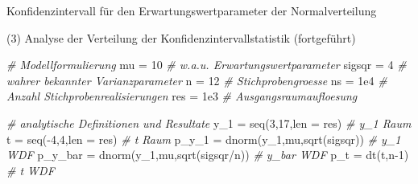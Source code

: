 \documentclass[
  8pt,
  ignorenonframetext,
]{beamer}
\newenvironment{Shaded}{\begin{snugshade}}{\end{snugshade}}
\newcommand{\AttributeTok}[1]{\textcolor[rgb]{0.77,0.63,0.00}{#1}}
\newcommand{\CommentTok}[1]{\textcolor[rgb]{0.56,0.35,0.01}{\textit{#1}}}
\newcommand{\DecValTok}[1]{\textcolor[rgb]{0.00,0.00,0.81}{#1}}
\newcommand{\FloatTok}[1]{\textcolor[rgb]{0.00,0.00,0.81}{#1}}
\newcommand{\FunctionTok}[1]{\textcolor[rgb]{0.00,0.00,0.00}{#1}}
\newcommand{\NormalTok}[1]{#1}
\newcommand{\OtherTok}[1]{\textcolor[rgb]{0.56,0.35,0.01}{#1}}
\newcommand{\SpecialCharTok}[1]{\textcolor[rgb]{0.00,0.00,0.00}{#1}}
\begin{document}
\begin{frame}[fragile]{Konfidenzintervall für den
Erwartungswertparameter der Normalverteilung}
\protect\hypertarget{konfidenzintervall-fuxfcr-den-erwartungswertparameter-der-normalverteilung-1}{}
\normalsize

\noindent (3) Analyse der Verteilung der Konfidenzintervallstatistik
(fortgeführt) \vspace{2mm}

\tiny
{}

\begin{Shaded}
\begin{Highlighting}[]
\CommentTok{\# Modellformulierung}
\NormalTok{mu      }\OtherTok{=} \DecValTok{10}                                          \CommentTok{\# w.a.u. Erwartungswertparameter}
\NormalTok{sigsqr  }\OtherTok{=} \DecValTok{4}                                           \CommentTok{\# wahrer bekannter Varianzparameter}
\NormalTok{n       }\OtherTok{=} \DecValTok{12}                                          \CommentTok{\# Stichprobengroesse}
\NormalTok{ns      }\OtherTok{=} \FloatTok{1e4}                                         \CommentTok{\# Anzahl Stichprobenrealisierungen}
\NormalTok{res     }\OtherTok{=} \FloatTok{1e3}                                         \CommentTok{\# Ausgangsraumaufloesung}

\CommentTok{\# analytische Definitionen und Resultate}
\NormalTok{y\_1     }\OtherTok{=} \FunctionTok{seq}\NormalTok{(}\DecValTok{3}\NormalTok{,}\DecValTok{17}\NormalTok{,}\AttributeTok{len =}\NormalTok{ res)                         }\CommentTok{\# y\_1 Raum}
\NormalTok{t       }\OtherTok{=} \FunctionTok{seq}\NormalTok{(}\SpecialCharTok{{-}}\DecValTok{4}\NormalTok{,}\DecValTok{4}\NormalTok{,}\AttributeTok{len =}\NormalTok{ res)                         }\CommentTok{\# t Raum}
\NormalTok{p\_y\_1   }\OtherTok{=} \FunctionTok{dnorm}\NormalTok{(y\_1,mu,}\FunctionTok{sqrt}\NormalTok{(sigsqr))                  }\CommentTok{\# y\_1 WDF}
\NormalTok{p\_y\_bar }\OtherTok{=} \FunctionTok{dnorm}\NormalTok{(y\_1,mu,}\FunctionTok{sqrt}\NormalTok{(sigsqr}\SpecialCharTok{/}\NormalTok{n))                }\CommentTok{\# y\_bar WDF}
\NormalTok{p\_t     }\OtherTok{=} \FunctionTok{dt}\NormalTok{(t,n}\DecValTok{{-}1}\NormalTok{)                                   }\CommentTok{\# t WDF}


\end{Highlighting}
\end{Shaded}
\end{frame}
\end{document}
